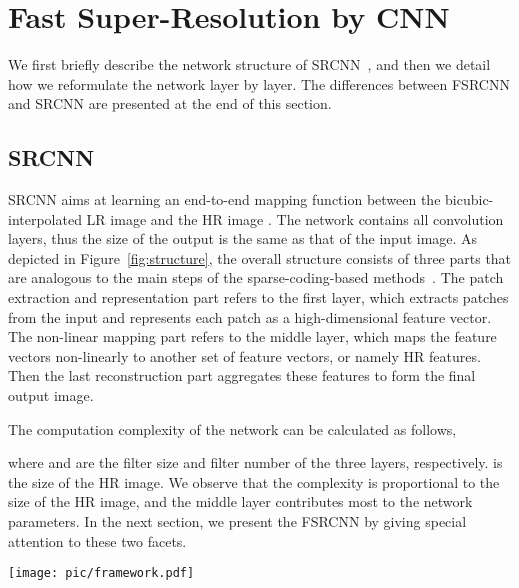 \documentclass[runningheads]{llncs}
\begin{document}
\section{Fast Super-Resolution by CNN}

We first briefly describe the network structure of SRCNN~\cite{Dong2014,Dong2015}, and then we detail how we reformulate the network layer by layer. The differences between FSRCNN and SRCNN are presented at the end of this section.

\subsection{SRCNN}
SRCNN aims at learning an end-to-end mapping function  between the bicubic-interpolated LR image  and the HR image . The network contains all convolution layers, thus the size of the output is the same as that of the input image.  As depicted in Figure~\ref{fig:structure}, the overall structure consists of three parts that are analogous to the main steps of the sparse-coding-based methods~\cite{Yang2010a}. The patch extraction and representation part refers to the first layer, which extracts patches from the input and represents each patch as a high-dimensional feature vector. The non-linear mapping part refers to the middle layer, which maps the feature vectors non-linearly to another set of feature vectors, or namely HR features. Then the last reconstruction part aggregates these features to form the final output image.

The computation complexity of the network can be calculated as follows,

where  and  are the filter size and filter number of the three layers, respectively.  is the size of the HR image. We observe that the complexity is proportional to the size of the HR image, and the middle layer contributes most to the network parameters. In the next section, we present the FSRCNN by giving special attention to these two facets.

\begin{figure*}[t]
\centering
  \texttt{[image: pic/framework.pdf]}
\caption{This figure shows the network structures of the SRCNN and FSRCNN. The proposed FSRCNN is different from SRCNN mainly in three aspects. First, FSRCNN adopts the original low-resolution image as input without bicubic interpolation. A deconvolution layer is introduced at the end of the network to perform upsampling. Second, The non-linear mapping step in SRCNN is replaced by three steps in FSRCNN, namely the shrinking, mapping, and expanding step. Third, FSRCNN adopts smaller filter sizes and a deeper network structure. These improvements provide FSRCNN with better performance but lower computational cost than SRCNN.}
  \label{fig:structure}
\end{figure*}
\end{document}
